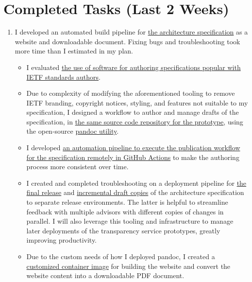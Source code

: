 \documentclass{jdf}
\begin{document}
\section*{Completed Tasks (Last 2 Weeks)}

\begin{enumerate}
    \item I developed an automated build pipeline for \hyperlink{https://add-architecture-draft--conmotion.netlify.app/architecture.html}{the architecture specification} as a website and downloadable document. Fixing bugs and troubleshooting took more time than I estimated in my plan.
        \begin{itemize}
            \item I evaluated \hyperlink{https://github.com/martinthomson/i-d-template}{the use of software for authoring specifications popular with IETF standards authors}.
            \item Due to complexity of modifying the aforementioned tooling to remove IETF branding, copyright notices, styling, and features not suitable to my specification, I designed a workflow to author and manage drafts of the specification, in \hyperlink{https://github.com/aj-stein/conmotion/}{the same source code repository for the prototype}, using the open-source \hyperlink{https://pandoc.org/}{pandoc utility}.
            \item I developed \hyperlink{https://github.com/aj-stein/conmotion/blob/develop/.github/workflows/cd.yml}{an automation pipeline to execute the publication workflow for the specification remotely in GitHub Actions} to make the authoring process more consistent over time.
            \item I created and completed troubleshooting on a deployment pipeline for \hyperlink{https://aj-stein.github.io/conmotion/}{the final release} and \hyperlink{https://conmotion.netlify.app/}{incremental draft copies} of the architecture specification to separate release environments. The latter is helpful to streamline feedback with multiple advisors with different copies of changes in parallel. I will also leverage this tooling and infrastructure to manage later deployments of the transparency service prototypes, greatly improving productivity. 
            \item Due to the custom needs of how I deployed pandoc, I created a \hyperlink{https://github.com/users/aj-stein/packages/container/package/pandoc\%2Flatex}{customized container image} for building the website and convert the website content into a downloadable PDF document.

\end{itemize}
\end{enumerate}
\end{document}

